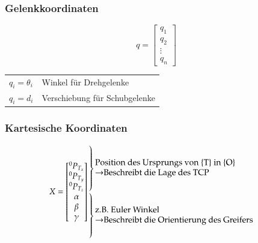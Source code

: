 \begin{multicols}{2}
    \begin{minipage}{\linewidth}
        \subsubsection{Gelenkkoordinaten}
        \vspace{-1cm}
        \[ q=\begin{bmatrix}
        q_1\\
        q_2\\
        \vdots\\
        q_n
        \end{bmatrix} \]
        \begin{tabular}{ll}
            $q_i = \theta_i$ & Winkel für Drehgelenke\\
            $q_i = d_i$& Verschiebung für Schubgelenke\\
        \end{tabular}
    \end{minipage}

    \begin{minipage}{\linewidth}
        \subsubsection{Kartesische Koordinaten}
        \vspace{-1cm}
        \[ X= \begin{bmatrix}
            {}^0 P_{T_x}\\
            {}^0 P_{T_y}\\
            {}^0 P_{T_z}\\
            \alpha\\
            \beta\\
            \gamma
            \end{bmatrix}           
    \begin{array}{@{\kern-\nulldelimiterspace}l@{}}
          \left.\begin{array}{@{}c@{}}
              \vphantom{\vdots}\\
              \vphantom{\vdots}\\
              \vphantom{\vdots}
          \end{array}\right\}
          \parbox{20em}{Position des Ursprungs von \{T\} in \{O\}\\
          $\rightarrow$Beschreibt die Lage des TCP }\\
          \left.\begin{array}{@{}c@{}}
              \vphantom{\vdots}\\
              \vphantom{\vdots}\\
              \vphantom{\vdots}
          \end{array}\right\}\parbox{20em}{z.B. Euler Winkel\\
              $\rightarrow$Beschreibt die Orientierung des Greifers }\\
      \end{array}
        \]
    \end{minipage}
\end{multicols}
